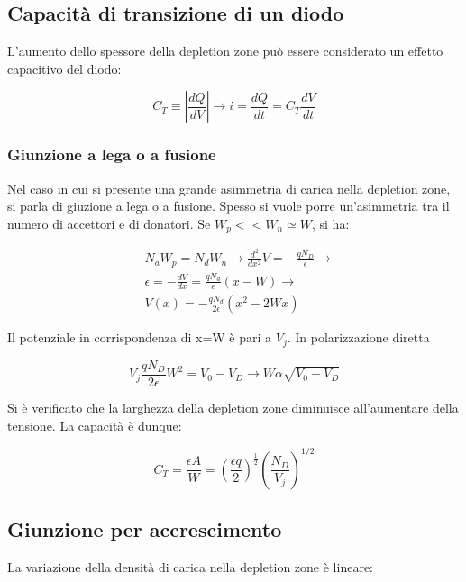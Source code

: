 \documentclass{article}
\begin{document}
\subsection{Capacità di transizione di un diodo}

L'aumento dello spessore della depletion zone può essere considerato un effetto capacitivo del diodo:

\begin{equation}
    C_T \equiv |\frac{dQ}{dV}| \rightarrow i=\frac{dQ}{dt}=C_T\frac{dV}{dt}
\end{equation}

\subsubsection{Giunzione a lega o a fusione}
Nel caso in cui si presente una grande asimmetria di carica nella depletion zone, si parla di giuzione a lega o a fusione.
Spesso si vuole porre un'asimmetria tra il numero di accettori e di donatori.
Se $W_p<<W_n\simeq W$, si ha:

\begin{equation}
    \begin{aligned}
         & N_aW_p=N_dW_n \rightarrow \frac{d^2}{dx^2} V=-\frac{qN_D}{\epsilon} \rightarrow \\
         & \epsilon = -\frac{dV}{dx}=\frac{qN_d}{\epsilon}(x-W) \rightarrow                \\
         & V(x)=-\frac{qN_d}{2\epsilon}(x^2-2Wx)
    \end{aligned}
\end{equation}

Il potenziale in corrispondenza di x=W è pari a $V_j$. In polarizzazione diretta

\begin{equation}
    V_j\frac{qN_D}{2\epsilon}W^2=V_0-V_D \rightarrow W \alpha \sqrt{V_0-V_D}
\end{equation}

Si è verificato che la larghezza della depletion zone diminuisce all'aumentare della tensione.
La capacità è dunque:

\begin{equation}
    C_T=\frac{\epsilon A}{W}=(\frac{\epsilon q}{2})^{\frac{1}{2}}(\frac{N_D}{V_j})^{1/2}
\end{equation}

\subsection{Giunzione per accrescimento}
La variazione della densità di carica nella depletion zone è lineare:
\end{document}
